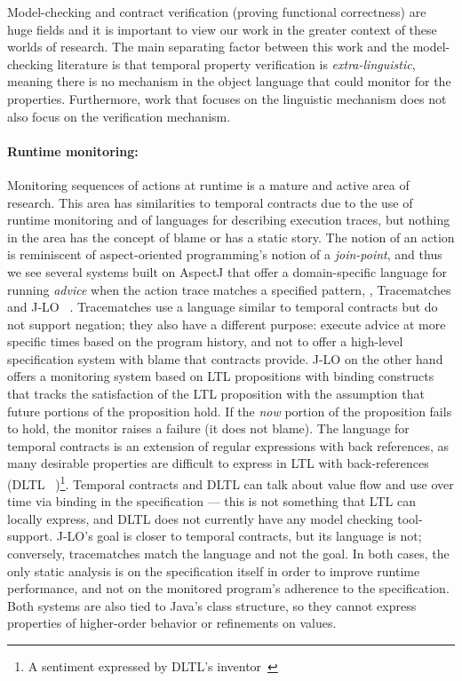 Model-checking and contract verification (proving functional correctness) are huge fields and it is important to view our work in the greater context of these worlds of research.
%
The main separating factor between this work and the model-checking literature is that temporal property verification is \emph{extra-linguistic}, meaning there is no mechanism in the object language that could monitor for the properties.
%
Furthermore, work that focuses on the linguistic mechanism does not also focus on the verification mechanism.

\paragraph{Runtime monitoring:}
Monitoring sequences of actions at runtime is a mature and active area of research.
%
This area has similarities to temporal contracts due to the use of runtime monitoring and of languages for describing execution traces, but nothing in the area has the concept of blame or has a static story.
%
The notion of an action is reminiscent of aspect-oriented programming's notion of a \emph{join-point}, and thus we see several systems built on AspectJ \citep{ianjohnson:aspectj} that offer a domain-specific language for running \emph{advice} when the action trace matches a specified pattern, \eg, Tracematches \citep{ianjohnson:Allan05addingtrace} and J-LO ~\citep{ianjohnson:jlo}.
%
Tracematches use a language similar to temporal contracts but do not support negation; they also have a different purpose: execute advice at more specific times based on the program history, and not to offer a high-level specification system with blame that contracts provide.
%
J-LO on the other hand offers a monitoring system based on LTL propositions with binding constructs that tracks the satisfaction of the LTL proposition with the assumption that future portions of the proposition hold.
%
If the \emph{now} portion of the proposition fails to hold, the monitor raises a failure (it does not blame).
%
The language for temporal contracts is an extension of regular expressions with back references, as many desirable properties are difficult to express in LTL with back-references (DLTL ~\cite{ianjohnson:jlo})\footnote{A sentiment expressed by DLTL's inventor~\citep{boddenadmission}}.
%
Temporal contracts and DLTL can talk about value flow and use over time via binding in the specification --- this is not something that LTL can locally express, and DLTL does not currently have any model checking tool-support.
%
J-LO's goal is closer to temporal contracts, but its language is not; conversely, tracematches match the language and not the goal.
%
In both cases, the only static analysis is on the specification itself in order to improve runtime performance, and not on the monitored program's adherence to the specification.
%
Both systems are also tied to Java's class structure, so they cannot express properties of higher-order behavior or refinements on values.

